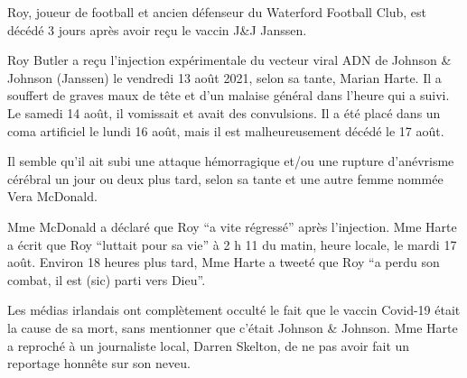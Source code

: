 Roy, joueur de football et ancien défenseur du Waterford Football Club, est
décédé 3 jours après avoir reçu le vaccin J\&J Janssen.

Roy Butler a reçu l'injection expérimentale du vecteur viral ADN de Johnson \&
Johnson (Janssen) le vendredi 13 août 2021, selon sa tante, Marian Harte. Il a
souffert de graves maux de tête et d'un malaise général dans l'heure qui a
suivi. Le samedi 14 août, il vomissait et avait des convulsions. Il a été placé
dans un coma artificiel le lundi 16 août, mais il est malheureusement décédé le
17 août.

Il semble qu'il ait subi une attaque hémorragique et/ou une rupture d'anévrisme
cérébral un jour ou deux plus tard, selon sa tante et une autre femme nommée
Vera McDonald.

Mme McDonald a déclaré que Roy ``a vite régressé'' après l'injection. Mme Harte
a écrit que Roy ``luttait pour sa vie'' à 2 h 11 du matin, heure locale, le
mardi 17 août. Environ 18 heures plus tard, Mme Harte a tweeté que Roy ``a perdu
son combat, il est (sic) parti vers Dieu''.

Les médias irlandais ont complètement occulté le fait que le vaccin Covid-19
était la cause de sa mort, sans mentionner que c'était Johnson \& Johnson. Mme
Harte a reproché à un journaliste local, Darren Skelton, de ne pas avoir fait un
reportage honnête sur son neveu.
